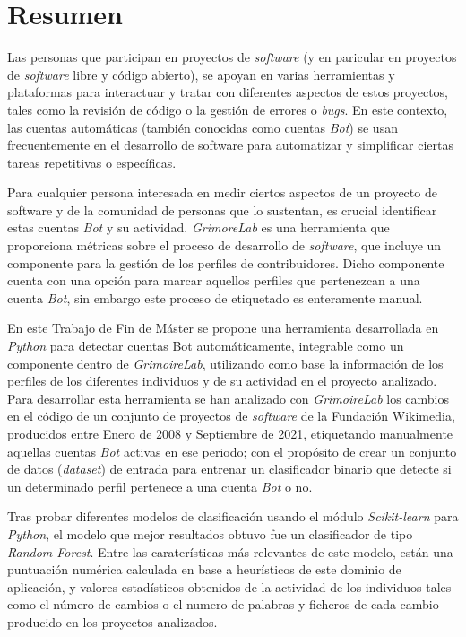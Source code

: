 \documentclass[a4paper, 12pt]{book}
\begin{document}

\chapter*{Resumen}

Las personas que participan en proyectos de \emph{software} (y en paricular en proyectos de \emph{software} libre y código abierto), se apoyan en varias herramientas y plataformas para interactuar y tratar con diferentes aspectos de estos proyectos, tales como la revisión de código o la gestión de errores o \emph{bugs}. En este contexto, las cuentas automáticas (también conocidas como cuentas \emph{Bot}) se usan frecuentemente en el desarrollo de software para automatizar y simplificar ciertas tareas repetitivas o específicas.

Para cualquier persona interesada en medir ciertos aspectos de un proyecto de software y de la comunidad de personas que lo sustentan, es crucial identificar estas cuentas \emph{Bot} y su actividad. \emph{GrimoreLab} es una herramienta que proporciona métricas sobre el proceso de desarrollo de \emph{software}, que incluye un componente para la gestión de los perfiles de contribuidores. Dicho componente cuenta con una opción para marcar aquellos perfiles que pertenezcan a una cuenta \emph{Bot}, sin embargo este proceso de etiquetado es enteramente manual.

En este Trabajo de Fin de Máster se propone una herramienta desarrollada en \emph{Python} para detectar cuentas Bot automáticamente, integrable como un componente dentro de \emph{GrimoireLab}, utilizando como base la información de los perfiles de los diferentes individuos y de su actividad en el proyecto analizado. Para desarrollar esta herramienta se han analizado con \emph{GrimoireLab} los cambios en el código de un conjunto de proyectos de \emph{software} de la Fundación Wikimedia, producidos entre Enero de 2008 y Septiembre de 2021, etiquetando manualmente aquellas cuentas \emph{Bot} activas en ese periodo; con el propósito de crear un conjunto de datos (\emph{dataset}) de entrada para entrenar un clasificador binario que detecte si un determinado perfil pertenece a una cuenta \emph{Bot} o no.

Tras probar diferentes modelos de clasificación usando el módulo \emph{Scikit-learn} para \emph{Python}, el modelo que mejor resultados obtuvo fue un clasificador de tipo \emph{Random Forest}. Entre las caraterísticas más relevantes de este modelo, están una puntuación numérica calculada en base a heurísticos de este dominio de aplicación, y valores estadísticos obtenidos de la actividad de los individuos tales como el número de cambios o el numero de palabras y ficheros de cada cambio producido en los proyectos analizados.
\end{document}
